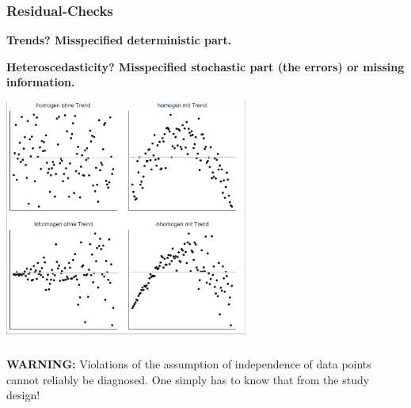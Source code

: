 \documentclass{beamer}
\begin{document}
\begin{frame}
    \frametitle{Residual-Checks}
    \textbf{Trends? Misspecified deterministic part.}
    
    \textbf{Heteroscedasticity? Misspecified stochastic part (the errors) or missing information.}
    
    \begin{center}
        \includegraphics[width=0.6\textwidth]{lectures/day_2_LM_refresh_I/figures/residuals.png}
    \end{center}
\end{frame}

%       

\begin{frame}
    \frametitle{}
    \textbf{WARNING:} Violations of the assumption of independence of data points cannot reliably be diagnosed. One simply has to know that from the study design!
\end{frame}
\end{document}
